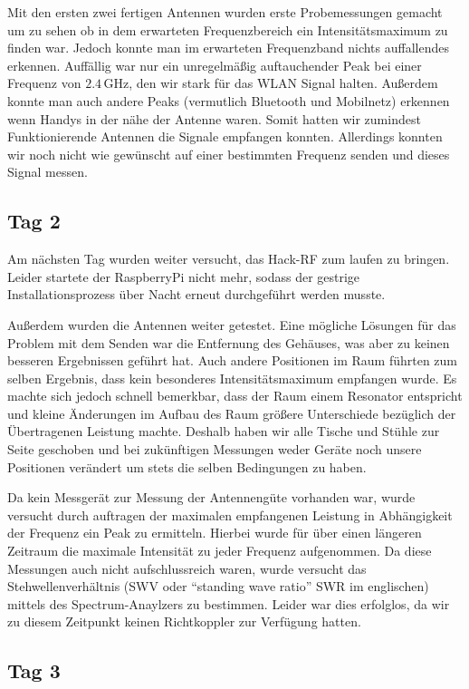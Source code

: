 \documentclass[titlepage,11pt,a4paper,ngerman]{article}
\begin{document}
Mit den ersten zwei fertigen Antennen wurden erste Probemessungen gemacht um zu sehen ob in dem erwarteten Frequenzbereich ein Intensitätsmaximum zu finden war. Jedoch konnte man im erwarteten Frequenzband nichts auffallendes erkennen. Auffällig war nur ein unregelmäßig auftauchender Peak bei einer Frequenz von $2.4\,$GHz, den wir stark für das WLAN Signal halten. Außerdem konnte man auch andere Peaks (vermutlich Bluetooth und Mobilnetz) erkennen wenn Handys in der nähe der Antenne waren. Somit hatten wir zumindest Funktionierende Antennen die Signale empfangen konnten. Allerdings konnten wir noch nicht wie gewünscht auf einer bestimmten Frequenz senden und dieses Signal messen.

\subsection{Tag 2}

Am nächsten Tag wurden weiter versucht, das Hack-RF zum laufen zu bringen. Leider startete der RaspberryPi nicht mehr, sodass der gestrige Installationsprozess über Nacht erneut durchgeführt werden musste.\par
Außerdem wurden die Antennen weiter getestet. Eine mögliche Lösungen für das Problem mit dem Senden war die Entfernung des Gehäuses, was aber zu keinen besseren Ergebnissen geführt hat. Auch andere Positionen im Raum führten zum selben Ergebnis, dass kein besonderes Intensitätsmaximum empfangen wurde. Es machte sich jedoch schnell bemerkbar, dass der Raum einem Resonator entspricht und kleine Änderungen im Aufbau des Raum größere Unterschiede bezüglich der Übertragenen Leistung machte. Deshalb haben wir alle Tische und Stühle zur Seite geschoben und bei zukünftigen Messungen weder Geräte noch unsere Positionen verändert um stets die selben Bedingungen zu haben.\par
Da kein Messgerät zur Messung der Antennengüte vorhanden war, wurde versucht durch auftragen der maximalen empfangenen Leistung in Abhängigkeit der Frequenz ein Peak zu ermitteln. Hierbei wurde für über einen längeren Zeitraum die maximale Intensität zu jeder Frequenz aufgenommen. Da diese Messungen auch nicht aufschlussreich waren, wurde versucht das Stehwellenverhältnis (SWV oder ``standing wave ratio'' SWR im englischen) mittels des Spectrum-Anaylzers zu bestimmen. Leider war dies erfolglos, da wir zu diesem Zeitpunkt keinen Richtkoppler zur Verfügung hatten.

\subsection{Tag 3}
\end{document}
